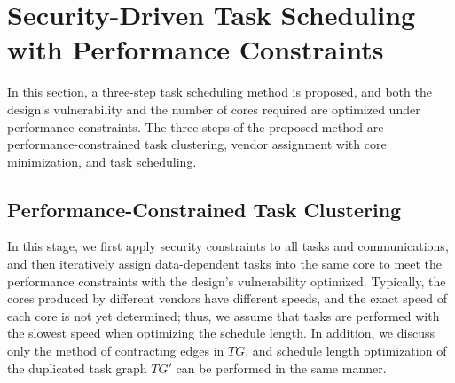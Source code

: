 \documentclass[10pt,journal, compsoc]{IEEEtran}
\begin{document}










\section{Security-Driven Task Scheduling with Performance Constraints}

In this section, a three-step task scheduling method is proposed, and both the design's vulnerability and the number of cores required are optimized under performance constraints. The three steps of the proposed method are performance-constrained task clustering, vendor assignment with core minimization, and task scheduling.




\subsection{Performance-Constrained Task Clustering}

In this stage, we first apply security constraints to all tasks and communications, and then iteratively assign data-dependent tasks into the same core to meet the performance constraints with the design's vulnerability optimized. Typically, the cores produced by different vendors have different speeds, and the exact speed of each core is not yet determined; thus, we assume that tasks are performed with the slowest speed when optimizing the schedule length. In addition, we discuss only the method of contracting edges in $TG$, and schedule length optimization of the duplicated task graph $TG'$ can be performed in the same manner.
\end{document}
